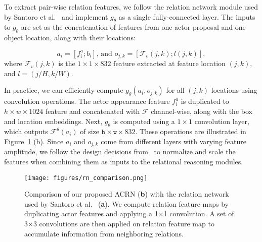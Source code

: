 \documentclass[runningheads]{llncs}
\begin{document}
To extract pair-wise relation features, we follow the relation network module used by Santoro et al.~\cite{RN_deepmind17} and implement $g_\theta$ as a single fully-connected layer. The inputs to $g_\theta$ are set as the concatenation of features from one actor proposal and one object location, along with their locations:

\begin{equation}
    a_i = \left[f^a_i; b_i\right] \text{, and } o_{j,k} = \left[\mathcal{F}_v(j,k); l\left(j,k\right)\right], 
\end{equation}
where $\mathcal{F}_v(j,k)$ is the $1\times1\times832$ feature extracted at feature location $(j,k)$, and $l = (j/H, k/W)$.

In practice, we can efficiently compute $g_\theta(a_i, o_{j,k})$ for all $(j,k)$ locations using convolution operations. The actor appearance feature $f^a_i$ is duplicated to $h\times w\times1024$ feature and concatenated with $\mathcal{F}$ channel-wise, along with the box and location embeddings. Next, $g_\theta$ is computed using a $1\times1$ convolution layer, which outputs $\mathcal{F}^\theta(a_i)$ of size $\texttt{h}\times \texttt{w}\times832$. These operations are illustrated in Figure~\ref{fig:acrn_compare} (b). Since $a_i$ and $o_{j,k}$ come from different layers with varying feature amplitude, we follow the design decisions from~\cite{bell2016inside,parsenet,shrivastava2016contextual} to normalize and scale the features when combining them as inputs to the relational reasoning modules.

\begin{figure}[t]
    \centering
    \texttt{[image: figures/rn\_comparison.png]}
    \caption{Comparison of our proposed ACRN (\textbf{b})  with the relation network used by Santoro et al.~\cite{RN_deepmind17} (\textbf{a}). We compute relation feature maps by duplicating actor features and applying a 1$\times$1 convolution. A set of 3$\times$3 convolutions are then applied on relation feature map to accumulate information from neighboring relations.}
    \label{fig:acrn_compare}
\end{figure}
\end{document}
